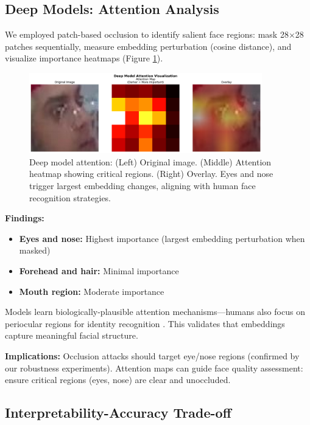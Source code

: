 \documentclass[11pt,a4paper]{article}
\begin{document}
\subsection{Deep Models: Attention Analysis}

We employed patch-based occlusion to identify salient face regions: mask 28×28 patches sequentially, measure embedding perturbation (cosine distance), and visualize importance heatmaps (Figure \ref{fig:attention}).

\begin{figure}[H]
    \centering
    \includegraphics[width=0.9\textwidth]{runs/explainability/deep_attention.png}
    \caption{Deep model attention: (Left) Original image. (Middle) Attention heatmap showing critical regions. (Right) Overlay. Eyes and nose trigger largest embedding changes, aligning with human face recognition strategies.}
    \label{fig:attention}
\end{figure}

\textbf{Findings:}
\begin{itemize}
    \item \textbf{Eyes and nose:} Highest importance (largest embedding perturbation when masked)
    \item \textbf{Forehead and hair:} Minimal importance
    \item \textbf{Mouth region:} Moderate importance
\end{itemize}

Models learn biologically-plausible attention mechanisms—humans also focus on periocular regions for identity recognition \cite{peterson2012eye}. This validates that embeddings capture meaningful facial structure.

\textbf{Implications:} Occlusion attacks should target eye/nose regions (confirmed by our robustness experiments). Attention maps can guide face quality assessment: ensure critical regions (eyes, nose) are clear and unoccluded.

\subsection{Interpretability-Accuracy Trade-off}
\end{document}
